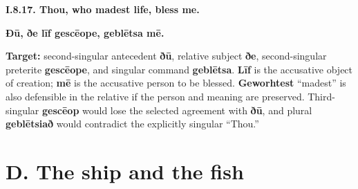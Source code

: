 \par\begin{minipage}{\linewidth}\raggedright
\textbf{I.8.17. Thou, who madest life, bless me.}

\textbf{Ðū, ðe līf gescēope, geblētsa mē.}

\textbf{Target:} second-singular antecedent \textbf{ðū}, relative subject \textbf{ðe}, second-singular preterite \textbf{gescēope}, and singular command \textbf{geblētsa}. \textbf{Līf} is the accusative object of creation; \textbf{mē} is the accusative person to be blessed. \textbf{Geworhtest} “madest” is also defensible in the relative if the person and meaning are preserved. Third-singular \textbf{gescēop} would lose the selected agreement with \textbf{ðū}, and plural \textbf{geblētsiað} would contradict the explicitly singular “Thou.”

\end{minipage}\par\addvspace{4pt}

\section*{D. The ship and the fish}

